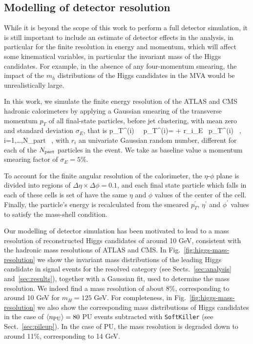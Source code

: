\subsection{Modelling of detector resolution}

While it is beyond the scope of this work to perform a full
detector simulation, it is still important to include an estimate of detector
effects in the analysis, in particular for the finite resolution
in energy and momentum, which will affect some kinematical variables, in particular
the invariant mass of the Higgs candidates.
%
For example, in the absence of any four-momentum smearing, the impact of the $m_h$
distributions of the Higgs candidates in the MVA
would be unrealistically large.

In this work, we simulate the finite energy resolution of the ATLAS and CMS
hadronic calorimeters by applying a Gaussian smearing of the transverse
momentum $p_T$ of all
final-state particles, before jet clustering,
with mean zero and standard deviation $\sigma_E$, that is
%
\be
\label{eq:smearing}
p_T^{(i)} \, \to \, p_T^{(i)\prime}= + r_i\cdot\sigma_E \rp\, p_T^{(i)} \, , \quad
i=1,\ldots,N_{\rm part} \, ,
\ee
with $r_i$ an univariate Gaussian random number, different for each
of the $N_{\rm part}$ particles in the event.
%
We take as baseline value a momentum smearing
factor of $\sigma_E=5\%$.
%


To account for the finite angular resolution of the calorimeter,
the $\eta$-$\phi$ plane is divided into regions of
$\Delta \eta \times \Delta \phi=0.1$, and each final state particle
which falls in each of these cells is set of have the same $\eta$
and $\phi$ values of the center of the cell.
%
Finally, the particle's energy is recalculated from the smeared $p_T^\prime$,
$\eta^\prime$ and $\phi^\prime$ values to satisfy the mass-shell
condition.


Our modelling of detector simulation has been motivated
to lead to a mass resolution of
reconstructed Higgs candidates of around 10 GeV, consistent
with the hadronic mass resolutions of ATLAS and CMS.
%
In  Fig.~\ref{fig:higgs-mass-resolution} we show the
invariant mass distributions of the leading
Higgs candidate in signal events for the
resolved category (see Sects.~\ref{sec:analysis}
and~\ref{sec:results}), together with
a Gaussian fit,
used to determine the mass resolution.
%
We indeed  find a mass resolution of about 8\%, corresponding
    to around 10 GeV for $m_H=125$ GeV.
%
    For completeness, in Fig.~\ref{fig:higgs-mass-resolution}
    we also show the corresponding
    mass distributions of Higgs candidates
    in the case of $\left\langle n_{\rm PU}\right\rangle=80$ PU events
    subtracted with {\tt SoftKiller} (see Sect.~\ref{sec:pileup}).
    In the case of PU, the mass resolution is degraded down to
    around 11\%, corresponding to 
    14 GeV.
        

